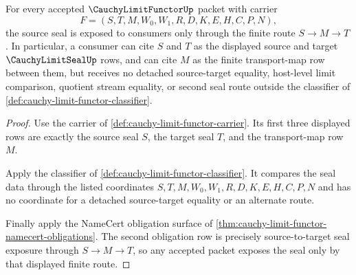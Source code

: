 \begin{theorem}
\label{thm:cauchy-limit-functor-source-target-seal-exposure}
For every accepted $\CauchyLimitFunctorUp$ packet with carrier
$$
F=(S,T,M,W_0,W_1,R,D,K,E,H,C,P,N),
$$
the source seal is exposed to consumers only through the finite route $S \to M \to T$. In particular, a consumer can cite $S$ and $T$ as the displayed source and target $\CauchyLimitSealUp$ rows, and can cite $M$ as the finite transport-map row between them, but receives no detached source-target equality, host-level limit comparison, quotient stream equality, or second seal route outside the classifier of \autoref{def:cauchy-limit-functor-classifier}.
\end{theorem}
\begin{proof}
Use the carrier of \autoref{def:cauchy-limit-functor-carrier}. Its first three displayed rows are exactly the source seal $S$, the target seal $T$, and the transport-map row $M$.

Apply the classifier of \autoref{def:cauchy-limit-functor-classifier}. It compares the seal data through the listed coordinates $S,T,M,W_0,W_1,R,D,K,E,H,C,P,N$ and has no coordinate for a detached source-target equality or an alternate route.

Finally apply the NameCert obligation surface of \autoref{thm:cauchy-limit-functor-namecert-obligations}. The second obligation row is precisely source-to-target seal exposure through $S \to M \to T$, so any accepted packet exposes the seal only by that displayed finite route.
\end{proof}

